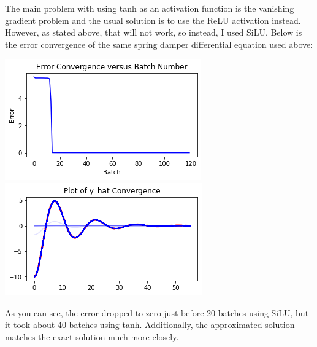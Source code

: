 \documentclass[12pt]{article}
\begin{document}
\begin{description}
\begin{minipage}{\linewidth}
    \end{minipage}
    The main problem with using tanh as an activation function is the vanishing
    gradient problem and the usual solution is to use the ReLU activation
    instead. However, as stated above, that will not work, so instead, I used
    SiLU. Below is the error convergence of the same spring damper differential
    equation used above: \\
    \begin{minipage}{\linewidth}
        \centering
        \includegraphics[scale=.5]{images/2ndsiluconv.png}
        \includegraphics[scale=.5]{images/2ndsilufn.png}
    \end{minipage}
    As you can see, the error dropped to zero just before 20 batches using
    SiLU, but it took about 40 batches using tanh. Additionally, the
    approximated solution matches the exact solution much more closely.


\end{description}
\end{document}
